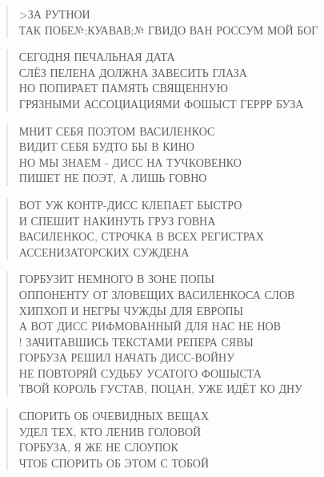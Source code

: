 \poemtitle{***}
\begin{verse}
>ЗА РУТНОИ\\
ТАК ПОБЕ№;КУАВАВ;№ ГВИДО ВАН РОССУМ МОЙ БОГ
\end{verse}

\poemtitle{***}
\begin{verse}
СЕГОДНЯ ПЕЧАЛЬНАЯ ДАТА\\
СЛЁЗ ПЕЛЕНА ДОЛЖНА ЗАВЕСИТЬ ГЛАЗА\\
НО ПОПИРАЕТ ПАМЯТЬ СВЯЩЕННУЮ\\
ГРЯЗНЫМИ АССОЦИАЦИЯМИ ФОШЫСТ ГЕРРР БУЗА
\end{verse}

\poemtitle{***}
\begin{verse}
МНИТ СЕБЯ ПОЭТОМ ВАСИЛЕНКОС\\
ВИДИТ СЕБЯ БУДТО БЫ В КИНО\\
НО МЫ ЗНАЕМ - ДИСС НА ТУЧКОВЕНКО\\
ПИШЕТ НЕ ПОЭТ, А ЛИШЬ ГОВНО
\end{verse}

\poemtitle{***}
\begin{verse}
ВОТ УЖ КОНТР-ДИСС КЛЕПАЕТ БЫСТРО\\
И СПЕШИТ НАКИНУТЬ ГРУЗ ГОВНА\\
ВАСИЛЕНКОС, СТРОЧКА В ВСЕХ РЕГИСТРАХ\\
АССЕНИЗАТОРСКИХ СУЖДЕНА
\end{verse}

\poemtitle{***}
\begin{verse}
ГОРБУЗИТ НЕМНОГО В ЗОНЕ ПОПЫ\\
ОППОНЕНТУ ОТ ЗЛОВЕЩИХ ВАСИЛЕНКОСА СЛОВ\\
ХИПХОП И НЕГРЫ ЧУЖДЫ ДЛЯ ЕВРОПЫ\\
А ВОТ ДИСС РИФМОВАННЫЙ ДЛЯ НАС НЕ НОВ\\!
ЗАЧИТАВШИСЬ ТЕКСТАМИ РЕПЕРА СЯВЫ\\
ГОРБУЗА РЕШИЛ НАЧАТЬ ДИСС-ВОЙНУ\\
НЕ ПОВТОРЯЙ СУДЬБУ УСАТОГО ФОШЫСТА\\
ТВОЙ КОРОЛЬ ГУСТАВ, ПОЦАН, УЖЕ ИДЁТ КО ДНУ
\end{verse}

\poemtitle{***}
\begin{verse}
СПОРИТЬ ОБ ОЧЕВИДНЫХ ВЕЩАХ\\
УДЕЛ ТЕХ, КТО ЛЕНИВ ГОЛОВОЙ\\
ГОРБУЗА, Я ЖЕ НЕ СЛОУПОК\\
ЧТОБ СПОРИТЬ ОБ ЭТОМ С ТОБОЙ
\end{verse}

